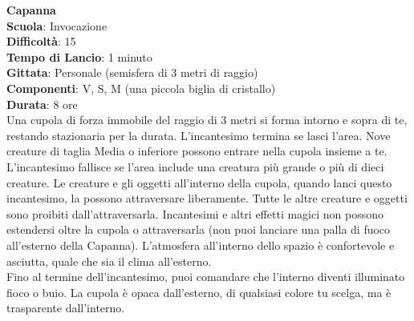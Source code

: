 \begin{multicols}{2}
\medskip\textbf{Capanna}\\
\textbf{Scuola}: Invocazione\\
\textbf{Difficoltà}: 15\\
\textbf{Tempo di Lancio}: 1 minuto\\
\textbf{Gittata}: Personale (semisfera di 3 metri di raggio)\\
\textbf{Componenti}: V, S, M (una piccola biglia di cristallo)\\
\textbf{Durata}: 8 ore\\
Una cupola di forza immobile del raggio di 3 metri si forma intorno e sopra di te, restando stazionaria per la durata. L'incantesimo termina se lasci l'area. Nove creature di taglia Media o inferiore possono entrare nella cupola insieme a te. L'incantesimo fallisce se l'area include una creatura più grande o più di dieci creature. Le creature e gli oggetti all'interno della cupola, quando lanci questo incantesimo, la possono attraversare liberamente. Tutte le altre creature e oggetti sono proibiti dall'attraversarla. Incantesimi e altri effetti magici non possono estendersi oltre la cupola o attraversarla (non puoi lanciare una palla di fuoco all'esterno della Capanna). L'atmosfera all'interno dello spazio è confortevole e asciutta, quale che sia il clima all'esterno.\\
Fino al termine dell'incantesimo, puoi comandare che l'interno diventi illuminato fioco o buio. La cupola è opaca dall'esterno, di qualsiasi colore tu scelga, ma è trasparente dall'interno. 


\end{multicols}
